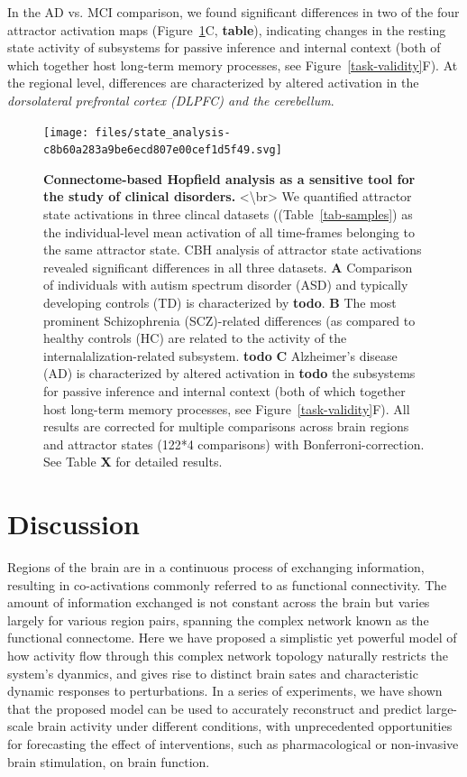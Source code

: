 \documentclass{article}
\begin{document}
In the AD vs. MCI comparison, we found significant differences in two of the four attractor activation maps (Figure~\ref{clinical-validity}C, \textbf{table}), indicating changes in the resting state activity of subsystems for passive inference and internal context (both of which together host long-term memory processes, see Figure~\ref{task-validity}F). At the regional level, differences are characterized by altered activation in the \textit{dorsolateral prefrontal cortex (DLPFC) and the cerebellum}.

\begin{figure}[!htbp]
\centering
\texttt{[image: files/state\_analysis-c8b60a283a9be6ecd807e00cef1d5f49.svg]}
\caption{\textbf{Connectome-based Hopfield analysis as a sensitive tool for the study of clinical disorders.} \newline
\textless {\textbackslash}br\textgreater 
We quantified attractor state activations in three clincal datasets ((Table~\ref{tab-samples}) as the individual-level mean activation of all time-frames belonging to the same attractor state.
CBH analysis of attractor state activations revealed significant differences in all three datasets.
\textbf{A} Comparison of individuals with autism spectrum disorder (ASD) and typically developing controls (TD) is characterized by \textbf{todo}.
\textbf{B} The most prominent Schizophrenia (SCZ)-related differences (as compared to healthy controls (HC) are related to the activity of the internalalization-related subsystem. \textbf{todo}
\textbf{C} Alzheimer's disease (AD) is characterized by altered activation in \textbf{todo} the subsystems for passive inference and internal context (both of which together host long-term memory processes, see Figure~\ref{task-validity}F). All results are corrected for multiple comparisons across brain regions and attractor states (122*4 comparisons) with Bonferroni-correction. See Table \textbf{X} for detailed results.}
\label{clinical-validity}
\end{figure}

\section{Discussion}\label{Discussion}

Regions of the brain are in a continuous process of exchanging information, resulting in co-activations commonly referred to as functional connectivity.
The amount of information exchanged is not constant across the brain but varies largely for various region pairs, spanning the complex network known as the functional connectome.
Here we have proposed a simplistic yet powerful model of how activity flow through this complex network topology naturally restricts the system's dyanmics, and gives rise to distinct brain sates and characteristic dynamic responses to perturbations.
In a series of experiments, we have shown that the proposed model can be used to accurately reconstruct and predict large-scale brain activity under different conditions, with unprecedented opportunities for forecasting the effect of interventions, such as pharmacological or non-invasive brain stimulation, on brain function.
\end{document}
